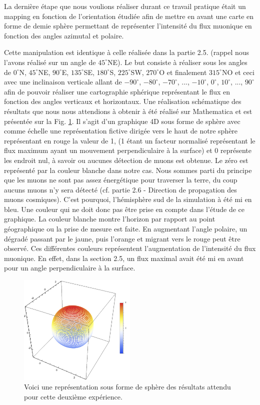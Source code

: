 \documentclass[12pt]{article}
\begin{document}
La dernière étape que nous voulions réaliser durant ce travail pratique était un mapping en fonction de l'orientation étudiée afin de mettre en avant une carte en forme de demie sphère permettant de représenter l'intensité du flux muonique en fonction des angles azimutal et polaire.

Cette manipulation est identique à celle réalisée dans la partie 2.5. (rappel nous l'avons réalisé sur un angle de $45^{\circ}$NE). Le but consiste à réaliser sous les angles de $0^{\circ}$N, $45^{\circ}$NE, $90^{\circ}$E, $135^{\circ}$SE, $180^{\circ}$S, $225^{\circ}$SW, $270^{\circ}$O et finalement $315^{\circ}$NO et ceci avec une inclinaison verticale allant de $-90^{\circ}$, $-80^{\circ}$, $-70^{\circ}$, ..., $-10^{\circ}$, $0^{\circ}$, $10^{\circ}$, ..., $90^{\circ}$ afin de pouvoir réaliser une cartographie sphérique représentant le flux en fonction des angles verticaux et horizontaux. Une réalisation schématique des résultats que nous nous attendions à obtenir à été réalisé sur Mathematica et est présentée sur la Fig. \ref{resultat_telescope_muon}. Il s'agit d'un graphique 4D sous forme de sphère avec comme échelle une représentation fictive dirigée vers le haut de notre sphère représentant en rouge la valeur de 1, (1 étant un facteur normalisé représentant le flux maximum ayant un mouvement perpendiculaire à la surface) et 0 représente les endroit nul, à savoir ou aucunes détection de muons est obtenue. Le zéro est représenté par la couleur blanche dans notre cas. Nous sommes parti du principe que les muons ne sont pas assez énergétique pour traverser la terre, du coup aucuns muons n'y sera détecté (cf. partie 2.6 - Direction de propagation des muons cosmiques). C'est pourquoi, l'hémisphère sud de la simulation à été mi en bleu. Une couleur qui ne doit donc pas être prise en compte dans l'étude de ce graphique. La couleur blanche montre l'horizon par rapport au point géographique ou la prise de mesure est faite. En augmentant l'angle polaire, un dégradé passant par le jaune, puis l'orange et migrant vers le rouge peut être observé. Ces différentes couleurs représentent l'augmentation de l'intensité du flux muonique. En effet, dans la section 2.5, un flux maximal avait été mi en avant pour un angle perpendiculaire à la surface.

\begin{figure}
    \centering
    \includegraphics[width=0.5\textwidth]{graphiques/experience2/resultat_telescope_muon.png}
    \captionsetup{width=0.8\textwidth}
    \caption{Voici une représentation sous forme de sphère des résultats attendu pour cette deuxième expérience.}
    \label{resultat_telescope_muon}
\end{figure}
\end{document}
